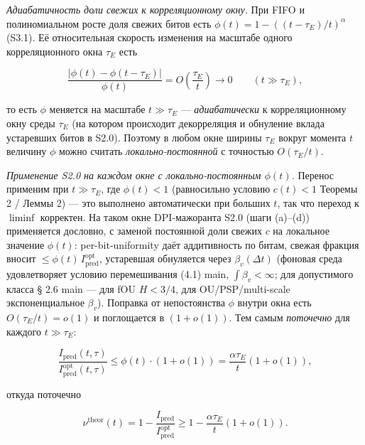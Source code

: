 \documentclass[12pt]{iopart}
\begin{document}
\emph{Адиабатичность доли свежих к корреляционному окну.} При FIFO и полиномиальном росте доля свежих битов есть \(\phi(t) = 1-((t-\tau_E)/t)^\alpha\) (S3.1). Её относительная скорость изменения на масштабе одного корреляционного окна \(\tau_E\) есть



\[\frac{|\phi(t)-\phi(t-\tau_E)|}{\phi(t)} = O\!\left(\frac{\tau_E}{t}\right) \to 0 \qquad (t \gg \tau_E),\]



то есть \(\phi\) меняется на масштабе \(t \gg \tau_E\) --- \emph{адиабатически} к корреляционному окну среды \(\tau_E\) (на котором происходит декорреляция и обнуление вклада устаревших битов в S2.0). Поэтому в любом окне ширины \(\tau_E\) вокруг момента \(t\) величину \(\phi\) можно считать \emph{локально-постоянной} с точностью \(O(\tau_E/t)\).



\emph{Применение S2.0 на каждом окне с локально-постоянным \(\phi(t)\).} Перенос применим при \(t \gg \tau_E\), где \(\phi(t) < 1\) (равносильно условию \(c(t) < 1\) Теоремы 2 / Леммы 2) --- это выполнено автоматически при больших \(t\), так что переход к \(\liminf\) корректен. На таком окне DPI-мажоранта S2.0 (шаги (a)--(d)) применяется дословно, с заменой постоянной доли свежих \(c\) на локальное значение \(\phi(t)\): per-bit-uniformity даёт аддитивность по битам, свежая фракция вносит \(\le \phi(t)\,I_{\text{pred}}^{\text{opt}}\), устаревшая обнуляется через \(\beta_v(\Delta t)\) (фоновая среда удовлетворяет условию перемешивания (4.1) main, \(\int\beta_v < \infty\); для допустимого класса § 2.6 main --- для fOU \(H<3/4\), для OU/PSP/multi-scale экспоненциальное \(\beta_v\)). Поправка от непостоянства \(\phi\) внутри окна есть \(O(\tau_E/t) = o(1)\) и поглощается в \((1+o(1))\). Тем самым \emph{поточечно} для каждого \(t \gg \tau_E\):



\begin{equation}\frac{I_{\text{pred}}(t,\tau)}{I_{\text{pred}}^{\text{opt}}(t,\tau)} \le \phi(t)\cdot(1+o(1)) = \frac{\alpha\tau_E}{t}(1+o(1)), \tag{S3.2a}\end{equation}



откуда поточечно



\begin{equation}\nu^{\text{theor}}(t) = 1 - \frac{I_{\text{pred}}}{I_{\text{pred}}^{\text{opt}}} \ge 1 - \frac{\alpha\tau_E}{t}(1+o(1)). \tag{S3.3}\end{equation}
\end{document}
